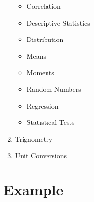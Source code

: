 \documentclass{article}
\begin{document}
\begin{enumerate}[label=\alph*) ]
		\begin{itemize}
			\item Correlation
			\item Descriptive Statistics
			\item Distribution
			\item Means
			\item Moments
			\item Random Numbers
			\item Regression
			\item Statistical Tests
		\end{itemize}
		\item Trignometry
		\item Unit Conversions
	\end{enumerate} \newpage

	\section*{Example}
\end{document}
